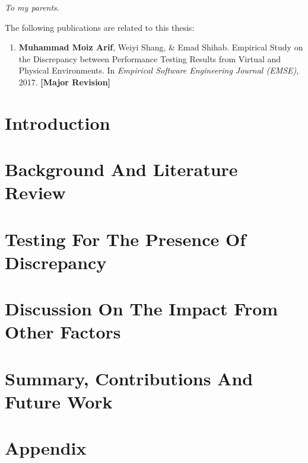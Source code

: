 \documentclass[12pt]{report}
\begin{document}
\begin{dedication}
	\begin{flushright}
		\textit{To my parents.}
	\end{flushright}

	
\end{dedication}

\begin{publications}

The following publications are related to this thesis:

\begin{enumerate}

\item {\textbf{Muhammad Moiz Arif}, Weiyi Shang, \& Emad Shihab. Empirical Study on the Discrepancy between Performance Testing Results from Virtual and Physical Environments. In \textit{Empirical Software Engineering Journal (EMSE)}, 2017. \textbf{[Major Revision]}} 

\end{enumerate}

\end{publications}

\chapter{Introduction}
\label{introduction}


\chapter{Background And Literature Review}
\label{background_and_literature_review}


\chapter{Testing For The Presence Of Discrepancy}
\label{chapter3}


\chapter{Discussion On The Impact From Other Factors}
\label{chapter4}


\chapter{Summary, Contributions And Future Work}
\label{conclusion}


\chapter{Appendix}
\label{appendix}


  

\end{document}
